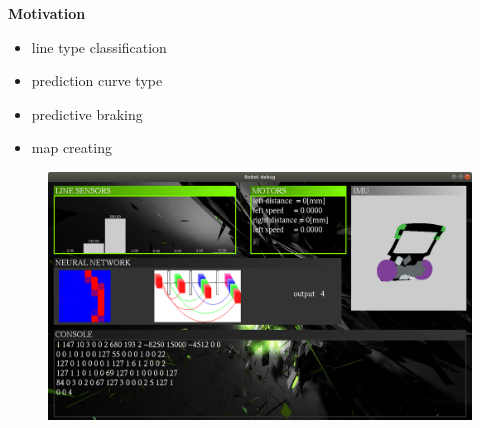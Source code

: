 \documentclass[xcolor=dvipsnames]{beamer}
\begin{document}
\begin{frame}{\bf Motivation}

\begin{itemize}
  \item line type classification
  \item prediction curve type
  \item predictive braking
  \item map creating
\end{itemize}

  \begin{figure}
    \includegraphics[scale=0.2]{../../pictures/robot_debug_app.png}
  \end{figure}


\end{frame}
\end{document}
